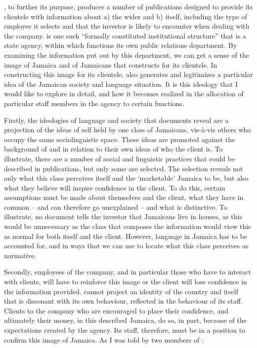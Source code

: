 , to further its purpose, produces a number of publications designed to provide its clientele with information about a) the wider  and b)  itself, including the type of employee it selects and that the investor is likely to encounter when dealing with the company.   is one such “formally constituted institutional structure” that is a state agency, within which functions its own public relations department.  By examining the information put out by this department, we can get a sense of the image of Jamaica and of Jamaicans that  constructs for its clientele.  In constructing this image for its clientele,  also generates and legitimizes a particular idea of the Jamaican society and language situation.  It is this ideology that I would like to explore in detail, and how it becomes realized in the allocation of particular staff members in the agency to certain functions.

Firstly, the ideologies of language and society that  documents reveal are a projection of the ideas of self held by one class of Jamaicans, vis-à-vis others who occupy the same sociolinguistic space.  These ideas are promoted against the background of and in relation to their own ideas of who the client is.  To illustrate, there are a number of social and linguistic practices that could be described in  publications, but only some are selected.  The selection reveals not only what this class perceives itself and the ‘marketable’ Jamaica to be, but also what they believe will inspire confidence in the client.  To do this, certain assumptions must be made about themselves and the client, what they have in common – and can therefore go unexplained – and what is distinctive.  To illustrate, no  document tells the investor that Jamaicans live in houses, as this would be unnecessary as the class that composes the information would view this as normal for both itself and the client.  However, language in Jamaica has to be accounted for, and in ways that we can use to locate what this class perceives as normative.  

Secondly, employees of the company, and in particular those who have to interact with clients, will have to reinforce this image or the client will lose confidence in the information provided.   cannot project an identity of the country and itself that is dissonant with its own behaviour, reflected in the behaviour of its staff.  Clients to the company who are encouraged to place their confidence, and ultimately their money, in this described Jamaica, do so, in part, because of the expectations created by the agency.  Its staff, therefore, must be in a position to confirm this image of Jamaica.  As I was told by two members of :

